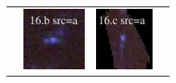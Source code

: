 \documentclass[useAMS,usenatbib]{mn2e}
\begin{document}
\begin{table}
\begin{tabular}{cccc}
    & \multicolumn{1}{m{1.7cm}}{\includegraphics[height=2.00cm,clip]{figs/enfw_img/rgb.pre_16_b_a_tri.ps}}
    & \multicolumn{1}{m{1.7cm}}{\includegraphics[height=2.00cm,clip]{figs/enfw_img/rgb.pre_16_c_a_tri.ps}} \\
  \end{tabular}

\end{table}
\end{document}
